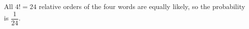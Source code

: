 All $4!=24$ relative orders of the four words are equally likely, so the probability is $\boxed{\dfrac1{24}}$.
